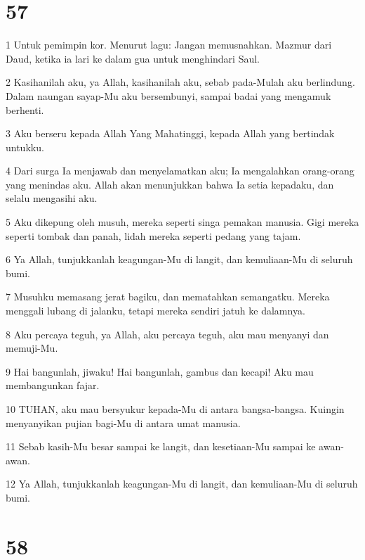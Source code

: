 \chapter{57}

\par 1 Untuk pemimpin kor. Menurut lagu: Jangan memusnahkan. Mazmur dari Daud, ketika ia lari ke dalam gua untuk menghindari Saul.
\par 2 Kasihanilah aku, ya Allah, kasihanilah aku, sebab pada-Mulah aku berlindung. Dalam naungan sayap-Mu aku bersembunyi, sampai badai yang mengamuk berhenti.
\par 3 Aku berseru kepada Allah Yang Mahatinggi, kepada Allah yang bertindak untukku.
\par 4 Dari surga Ia menjawab dan menyelamatkan aku; Ia mengalahkan orang-orang yang menindas aku. Allah akan menunjukkan bahwa Ia setia kepadaku, dan selalu mengasihi aku.
\par 5 Aku dikepung oleh musuh, mereka seperti singa pemakan manusia. Gigi mereka seperti tombak dan panah, lidah mereka seperti pedang yang tajam.
\par 6 Ya Allah, tunjukkanlah keagungan-Mu di langit, dan kemuliaan-Mu di seluruh bumi.
\par 7 Musuhku memasang jerat bagiku, dan mematahkan semangatku. Mereka menggali lubang di jalanku, tetapi mereka sendiri jatuh ke dalamnya.
\par 8 Aku percaya teguh, ya Allah, aku percaya teguh, aku mau menyanyi dan memuji-Mu.
\par 9 Hai bangunlah, jiwaku! Hai bangunlah, gambus dan kecapi! Aku mau membangunkan fajar.
\par 10 TUHAN, aku mau bersyukur kepada-Mu di antara bangsa-bangsa. Kuingin menyanyikan pujian bagi-Mu di antara umat manusia.
\par 11 Sebab kasih-Mu besar sampai ke langit, dan kesetiaan-Mu sampai ke awan-awan.
\par 12 Ya Allah, tunjukkanlah keagungan-Mu di langit, dan kemuliaan-Mu di seluruh bumi.

\chapter{58}


